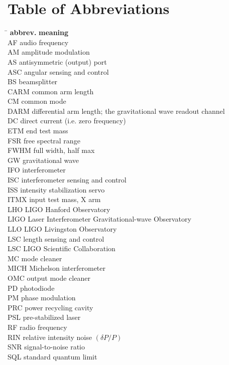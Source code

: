 \chapter{Table of Abbreviations}
\label{chapter6}
\singlespacing
\vspace{-20pt}
\begin{tabbing}
\hspace{1in} \= \hspace{5in} \kill
\textbf{abbrev.} \> \textbf{meaning} \\
AF   \> audio frequency \\
AM   \> amplitude modulation \\
AS   \> antisymmetric (output) port \\
ASC  \> angular sensing and control \\
BS   \> beamsplitter \\
CARM \> common arm length \\
CM   \> common mode \\
DARM \> differential arm length; the gravitational wave readout channel \\
DC   \> direct current (i.e. zero frequency) \\
ETM  \> end test mass \\
FSR  \> free spectral range \\
FWHM \> full width, half max \\
GW   \> gravitational wave \\
IFO  \> interferometer \\
ISC  \> interferometer sensing and control \\
ISS  \> intensity stabilization servo \\
ITMX \> input test mass, X arm \\
LHO  \> LIGO Hanford Observatory \\
LIGO \> Laser Interferometer Gravitational-wave Observatory \\
LLO  \> LIGO Livingston Observatory \\
LSC  \> length sensing and control \\
LSC  \> LIGO Scientific Collaboration \\
MC   \> mode cleaner \\
MICH \> Michelson interferometer \\
OMC  \> output mode cleaner \\
PD   \> photodiode \\
PM   \> phase modulation \\
PRC  \> power recycling cavity \\
PSL  \> pre-stabilized laser \\
RF   \> radio frequency \\
RIN  \> relative intensity noise $(\delta P/P)$ \\
SNR  \> signal-to-noise ratio \\
SQL  \> standard quantum limit
\end{tabbing}

